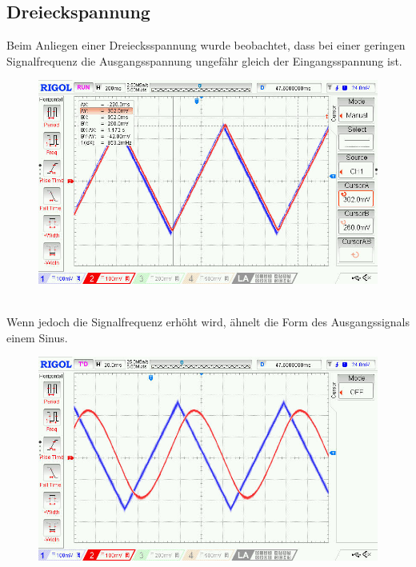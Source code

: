 \documentclass[twoside]{article}
\begin{document}
\subsection{Dreieckspannung}
Beim Anliegen einer Dreiecksspannung wurde beobachtet, dass bei einer geringen Signalfrequenz die Ausgangsspannung ungefähr gleich der Eingangsspannung ist.\\
\begin{figure}[h]
    \centering
    \includegraphics[width=0.85\linewidth]{img/Oszi_04.jpg}
\end{figure}\\
Wenn jedoch die Signalfrequenz erhöht wird, ähnelt die Form des Ausgangssignals einem Sinus.
\begin{figure}[h]
    \centering
    \includegraphics[width=0.85\linewidth]{img/Oszi_05.jpg}
\end{figure}
\end{document}

